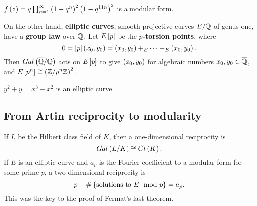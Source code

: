 \begin{example*}
$ f\rb{z} = q\prod_{n = 1}^\infty \rb{1 - q^n}^2\rb{1 - q^{11n}}^2 $ is a modular form.
\end{example*}

On the other hand, \textbf{elliptic curves}, smooth projective curves $ E / \Q $ of genus one, have a \textbf{group law} over $ \Q $. Let $ E\sb{p} $ be the \textbf{$ p $-torsion points}, where
$$ 0 = \sb{p}\rb{x_0, y_0} = \rb{x_0, y_0} +_E \dots +_E \rb{x_0, y_0}. $$
Then $ Gal\rb{\overline{\Q} / \Q} $ acts on $ E\sb{p} $ to give $ \rb{x_0, y_0} $ for algebraic numbers $ x_0, y_0 \in \overline{\Q} $, and $ E\sb{p^n} \cong \rb{\Z / p^n\Z}^2 $.

\begin{example*}
$ y^2 + y = x^3 - x^2 $ is an elliptic curve.
\end{example*}

\subsection{From Artin reciprocity to modularity}

If $ L $ be the Hilbert class field of $ K $, then a one-dimensional reciprocity is
$$ Gal\rb{L / K} \cong Cl\rb{K}. $$
If $ E $ is an elliptic curve and $ a_p $ is the Fourier coefficient to a modular form for some prime $ p $, a two-dimensional reciprocity is
$$ p - \#\cb{\text{solutions to} \ E \mod p} = a_p. $$
This was the key to the proof of Fermat's last theorem.


